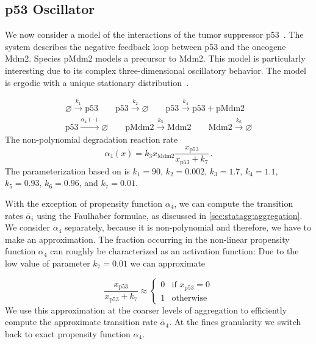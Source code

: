\subsection{p53 Oscillator}
We now consider a model of the interactions of the tumor suppressor p53~\cite{geva2006oscillations}. The system describes the negative feedback loop between  p53 and the oncogene Mdm2.
Species pMdm2 models a precursor to Mdm2. This model is particularly interesting due to its complex three-dimensional oscillatory behavior.
The model is ergodic with a unique stationary distribution~\cite{gupta2014scalable}.
\begin{model}[p53 Oscillator]\label{model:p53}
\begin{align*}
\varnothing \xrightarrow{k_1} \mathrm{p53} \qquad
\mathrm{p53} \xrightarrow{k_2} \varnothing \qquad
\mathrm{p53} \xrightarrow{k_4} \mathrm{p53} + \mathrm{pMdm2}
\\
\mathrm{p53} \xrightarrow{\alpha_4(\cdot)} \varnothing \qquad
\mathrm{pMdm2} \xrightarrow{k_5} \mathrm{Mdm2} \qquad
\mathrm{Mdm2} \xrightarrow{k_6} \varnothing
\end{align*}
The non-polynomial degradation reaction rate
$$
\alpha_4(x) =k_3 x_{\mathrm{Mdm2}} \frac{x_{\mathrm{p53}}}{x_{\mathrm{p53}} + k_7}\,.
$$
The parameterization based on \cite{ale2013general} is $k_1=90$, $k_2=0.002$, $k_3=1.7$, $k_4=1.1$, $k_5=0.93$, $k_6=0.96$, and $k_7 = 0.01$.
\end{model}
With the exception of propensity function $\alpha_4$, we can compute the transition rates $\bar{\alpha}_i$ using the Faulhaber formulae, as discussed in \autoref{sec:statagg:aggregation}.
We consider $\alpha_4$ separately, because it is non-polynomial and therefore, we have to make an approximation.
The fraction occurring in the non-linear propensity function $\alpha_4$ can roughly be characterized as an activation function:
Due to the low value of parameter $k_7=0.01$ we can approximate

$$\frac{x_{\mathrm{p53}}}{x_{\mathrm{p53}} + k_7}
\approx
\begin{cases}
0 & \text{if } x_{\mathrm{p53}} = 0\\
1 & \text{otherwise}
\end{cases}
$$
We use this approximation at the coarser levels of aggregation to efficiently compute the approximate transition rate $\bar{\alpha}_4$.
At the fines granularity we switch back to exact propensity function $\alpha_4$.

